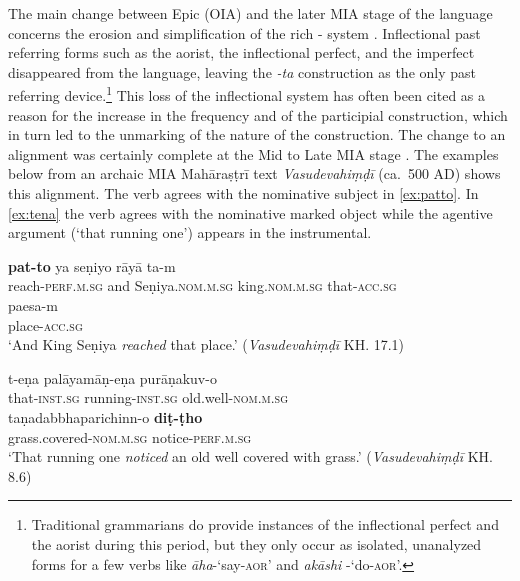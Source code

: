 \documentclass[output=paper,
modfonts
]{LSP/langsci}
\begin{document}
\largerpage%
The main change between Epic  (OIA) and the later MIA  stage of the
language concerns the erosion and simplification of the rich
- system \citep{pischel00,bloch65}.  Inflectional past
referring forms such as the aorist, the inflectional perfect, and the
imperfect disappeared from the language, leaving the \textit{-ta}
construction as the only past referring device.\footnote{Traditional
  grammarians do provide instances of the inflectional perfect and the
  aorist during this period, but they only occur as isolated,
  unanalyzed forms for a few verbs like \textit{āha}-`say-\textsc{aor}'
  and \textit{akāshi} -`do-\textsc{aor}'.}  This loss of the
inflectional system has often been cited as a reason for the increase
in the frequency and  of the participial construction, which in turn
led to the unmarking of the  nature of the construction. The change to an  alignment was certainly complete at the  Mid to Late MIA stage  \citep{hock1986,bubenik98}.
The examples below from an archaic MIA
Mahāraṣṭrī text \textit{Vasudevahiṃḍī}
(ca.\ 500 AD) shows this  alignment. The verb agrees with the
nominative subject in \cref{ex:patto}. In \cref{ex:tena} the verb agrees with
the nominative marked object while the agentive argument (`that running
one') appears in the instrumental. 

\begin{exe}
\ex\label{ex:jkl}
\begin{xlist}
\ex\label{ex:patto}\gll \textbf{pat-to}  ya  seṇiyo  rāyā   ta-m  \\
reach-\textsc{perf.m.sg}  and  Seṇiya.\textsc{nom.m.sg}  king.\textsc{nom.m.sg}  that-\textsc{acc.sg}  \\

\gll paesa-m \\
place-\textsc{acc.sg} \\

\glt `And King  Seṇiya \textit{reached} that place.' (\textit{Vasudevahiṃḍī} KH. 17.1)

\ex\label{ex:tena}\gll t-eṇa  palāyamāṇ-eṇa  purāṇakuv-o \\
that-\textsc{inst.sg}  running-\textsc{inst.sg}  old.well-\textsc{nom.m.sg} \\

\gll taṇadabbhaparichinn-o  \textbf{diṭ-ṭho} \\
grass.covered-\textsc{nom.m.sg}  notice-\textsc{perf.m.sg}\\

\glt `That running one \textit{noticed} an old well covered with grass.' (\textit{Vasudevahiṃḍī} KH. 8.6)
\end{xlist}
\end{exe}
\end{document}
